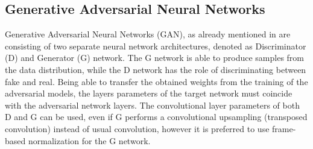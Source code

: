 
\subsection{Generative Adversarial Neural Networks}\label{sec:nn_arch_adv}
Generative Adversarial Neural Networks (GAN), as already mentioned in  are consisting of two separate neural network architectures, denoted as Discriminator (D) and Generator (G) network.
The G network is able to produce samples from the data distribution, while the D network has the role of discriminating between fake and real.
Being able to transfer the obtained weights from the training of the adversarial models, the layers parameters of the target network must coincide with the adversarial network layers.
The convolutional layer parameters of both D and G can be used, even if G performs a convolutional upsampling (transposed convolution) instead of usual convolution, however it is preferred to use frame-based normalization for the G network.

